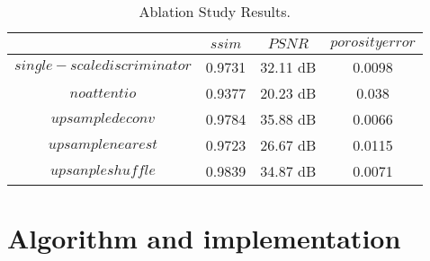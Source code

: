 \documentclass[a4paper,fleqn]{cas-sc}
\begin{document}
\begin{table}
	\centering
	\caption{Ablation Study Results.}
	\label{tab:Table2}
	\begin{tabular}{ |c||c|c|c|} 
		\hline
		& $ssim$  &  $PSNR$  &  $porosity error$\\ 
		\hline 
		\hline
		$single-scale discriminator$ & 0.9731 &  32.11 dB    &   0.0098  \\
		\hline
		$no attentio$ & 0.9377    &   20.23 dB    &   0.038    \\
		\hline
		$upsample deconv$ & 0.9784    &   35.88 dB     &   0.0066   \\
		\hline
		$upsample nearest$ & 0.9723    &   26.67 dB     &   0.0115   \\
		\hline
		$upsanple shuffle$ & 0.9839    &   34.87 dB     &   0.0071   \\
		\hline
	\end{tabular} 
\end{table}
\section{Algorithm and implementation}



 
\end{document}
